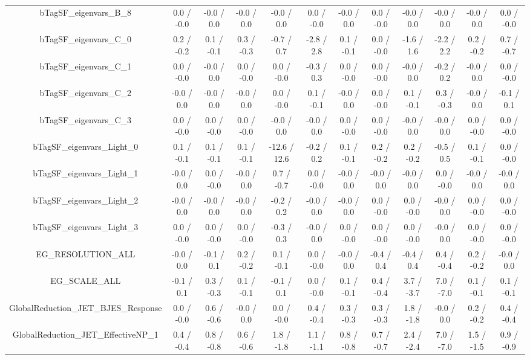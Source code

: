 \begin{table}[htbp]
\begin{center}
\begin{tabular}{|c|c|c|c|c|c|c|c|c|c|c|c|}
  bTagSF_eigenvars_B_8 & 0.0 / -0.0 & -0.0 / 0.0 & -0.0 / 0.0 & -0.0 / 0.0 & 0.0 / -0.0 & -0.0 / 0.0 & 0.0 / -0.0 & -0.0 / 0.0 & -0.0 / 0.0 & -0.0 / 0.0 & 0.0 / -0.0 \\ 
  bTagSF_eigenvars_C_0 & 0.2 / -0.2 & 0.1 / -0.1 & 0.3 / -0.3 & -0.7 / 0.7 & -2.8 / 2.8 & 0.1 / -0.1 & 0.0 / -0.0 & -1.6 / 1.6 & -2.2 / 2.2 & 0.2 / -0.2 & 0.7 / -0.7 \\ 
  bTagSF_eigenvars_C_1 & 0.0 / -0.0 & -0.0 / 0.0 & 0.0 / -0.0 & 0.0 / -0.0 & -0.3 / 0.3 & 0.0 / -0.0 & 0.0 / -0.0 & -0.0 / 0.0 & -0.2 / 0.2 & -0.0 / 0.0 & 0.0 / -0.0 \\ 
  bTagSF_eigenvars_C_2 & -0.0 / 0.0 & -0.0 / 0.0 & -0.0 / 0.0 & 0.0 / -0.0 & 0.1 / -0.1 & -0.0 / 0.0 & 0.0 / -0.0 & 0.1 / -0.1 & 0.3 / -0.3 & -0.0 / 0.0 & -0.1 / 0.1 \\ 
  bTagSF_eigenvars_C_3 & 0.0 / -0.0 & 0.0 / -0.0 & 0.0 / -0.0 & -0.0 / 0.0 & -0.0 / 0.0 & 0.0 / -0.0 & 0.0 / -0.0 & -0.0 / 0.0 & -0.0 / 0.0 & 0.0 / -0.0 & 0.0 / -0.0 \\ 
  bTagSF_eigenvars_Light_0 & 0.1 / -0.1 & 0.1 / -0.1 & 0.1 / -0.1 & -12.6 / 12.6 & -0.2 / 0.2 & 0.1 / -0.1 & 0.2 / -0.2 & 0.2 / -0.2 & -0.5 / 0.5 & 0.1 / -0.1 & 0.0 / -0.0 \\ 
  bTagSF_eigenvars_Light_1 & -0.0 / 0.0 & 0.0 / -0.0 & -0.0 / 0.0 & 0.7 / -0.7 & 0.0 / -0.0 & -0.0 / 0.0 & -0.0 / 0.0 & -0.0 / 0.0 & 0.0 / -0.0 & -0.0 / 0.0 & -0.0 / 0.0 \\ 
  bTagSF_eigenvars_Light_2 & -0.0 / 0.0 & -0.0 / 0.0 & -0.0 / 0.0 & -0.2 / 0.2 & -0.0 / 0.0 & -0.0 / 0.0 & 0.0 / -0.0 & 0.0 / -0.0 & -0.0 / 0.0 & 0.0 / -0.0 & 0.0 / -0.0 \\ 
  bTagSF_eigenvars_Light_3 & 0.0 / -0.0 & 0.0 / -0.0 & 0.0 / -0.0 & -0.3 / 0.3 & -0.0 / 0.0 & 0.0 / -0.0 & 0.0 / -0.0 & 0.0 / -0.0 & -0.0 / 0.0 & 0.0 / -0.0 & 0.0 / -0.0 \\ 
  EG_RESOLUTION_ALL & -0.0 / 0.0 & -0.1 / 0.1 & 0.2 / -0.2 & 0.1 / -0.1 & 0.0 / -0.0 & -0.0 / 0.0 & -0.4 / 0.4 & -0.4 / 0.4 & 0.4 / -0.4 & 0.2 / -0.2 & -0.0 / 0.0 \\ 
  EG_SCALE_ALL & -0.1 / 0.1 & 0.3 / -0.3 & 0.1 / -0.1 & -0.1 / 0.1 & 0.0 / -0.0 & 0.1 / -0.1 & 0.4 / -0.4 & 3.7 / -3.7 & 7.0 / -7.0 & 0.1 / -0.1 & 0.1 / -0.1 \\ 
  GlobalReduction_JET_BJES_Response & 0.0 / -0.0 & 0.6 / -0.6 & -0.0 / 0.0 & 0.0 / -0.0 & 0.4 / -0.4 & 0.3 / -0.3 & 0.3 / -0.3 & 1.8 / -1.8 & -0.0 / 0.0 & 0.2 / -0.2 & 0.4 / -0.4 \\ 
  GlobalReduction_JET_EffectiveNP_1 & 0.4 / -0.4 & 0.8 / -0.8 & 0.6 / -0.6 & 1.8 / -1.8 & 1.1 / -1.1 & 0.8 / -0.8 & 0.7 / -0.7 & 2.4 / -2.4 & 7.0 / -7.0 & 1.5 / -1.5 & 0.9 / -0.9 \\ 

\end{tabular}
\end{center}
\end{table}
